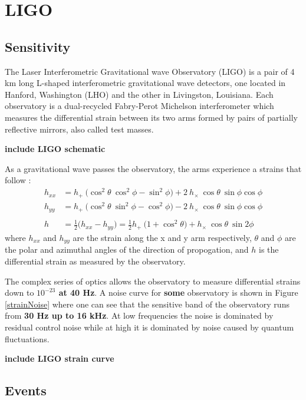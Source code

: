 \documentclass [12pt, proquest]{uwthesis}[2019]
\begin{document}
\section{LIGO}

\subsection{Sensitivity}

The Laser Interferometric Gravitational wave Observatory (LIGO) is a pair of 4 km long L-shaped interferometric gravitational wave detectors, one located in Hanford, Washington (LHO) and the other in Livingston, Louisiana. Each observatory is a dual-recycled Fabry-Perot Michelson interferometer which measures the differential strain between its two arms formed by pairs of partially reflective mirrors, also called test masses. 

\textbf{include LIGO schematic}

As a gravitational wave passes the observatory, the arms experience a strains that follow \cite{GWText}:
\begin{align}
h_{xx}&=h_+\ \big( \cos^2\theta\ \cos^2\phi-\sin^2\phi \big)+2\ h_\times\ \cos \theta\ \sin \phi \cos \phi \\
h_{yy}&=h_+\ \big( \cos^2\theta\ \sin^2\phi-\cos^2\phi \big)-2\ h_\times\ \cos \theta\ \sin \phi \cos \phi \\
\nonumber \\
h&=\frac{1}{2} \big( h_{xx}-h_{yy} \big)=\frac{1}{2}h_+\ \big( 1+\cos^2\theta \big)+ h_\times\ \cos \theta\ \sin 2 \phi 
\end{align}
where $h_{xx}$ and $h_{yy}$ are the strain along the x and y arm respectively, $\theta$ and $\phi$ are the polar and azimuthal angles of the direction of propogation, and $h$ is the differential strain as measured by the observatory.

The complex series of optics allows the observatory to measure differential strains down to \textbf{$10^{-23}$ at 40 Hz}.  A noise curve for \textbf{some} observatory is shown in Figure \ref{strainNoise} where one can see that the sensitive band of the observatory runs from \textbf{30 Hz up to 16 kHz}. At low frequencies the noise is dominated by residual control noise while at high it is dominated by noise caused by quantum fluctuations.  

\textbf{include LIGO strain curve}

\subsection{Events}
\end{document}

